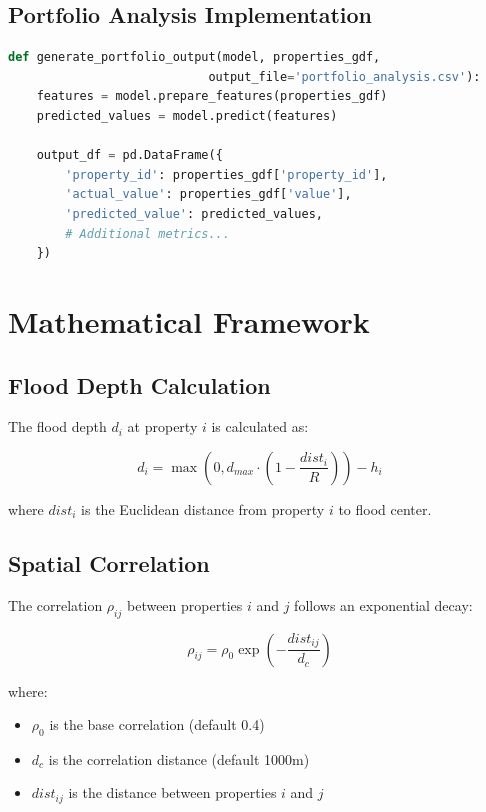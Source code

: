 \documentclass{article}
\begin{document}
\subsection{Portfolio Analysis Implementation}
\begin{lstlisting}[language=Python]
def generate_portfolio_output(model, properties_gdf, 
                            output_file='portfolio_analysis.csv'):
    features = model.prepare_features(properties_gdf)
    predicted_values = model.predict(features)
    
    output_df = pd.DataFrame({
        'property_id': properties_gdf['property_id'],
        'actual_value': properties_gdf['value'],
        'predicted_value': predicted_values,
        # Additional metrics...
    })
\end{lstlisting}



\section{Mathematical Framework}

\subsection{Flood Depth Calculation}
The flood depth $d_i$ at property $i$ is calculated as:

\begin{equation}
d_i = \max(0, d_{max} \cdot (1 - \frac{dist_i}{R})) - h_i
\end{equation}

where $dist_i$ is the Euclidean distance from property $i$ to flood center.

\subsection{Spatial Correlation}
The correlation $\rho_{ij}$ between properties $i$ and $j$ follows an exponential decay:

\begin{equation}
\rho_{ij} = \rho_0 \exp(-\frac{dist_{ij}}{d_c})
\end{equation}

where:
\begin{itemize}
    \item $\rho_0$ is the base correlation (default 0.4)
    \item $d_c$ is the correlation distance (default 1000m)
    \item $dist_{ij}$ is the distance between properties $i$ and $j$
\end{itemize}
\end{document}
